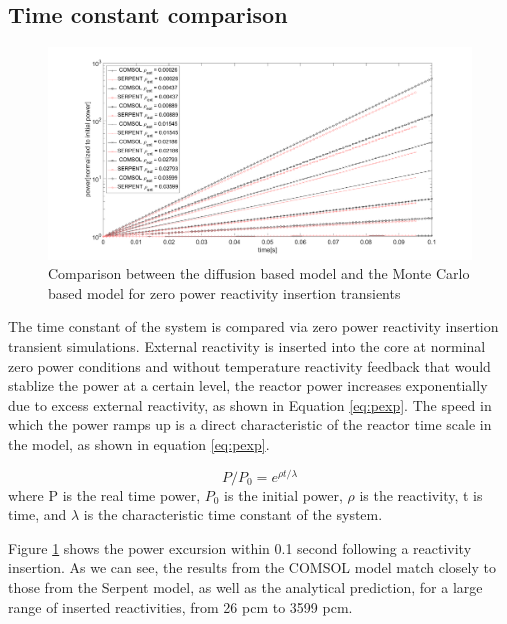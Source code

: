 \documentclass{elsarticle}
\begin{document}
\subsection{Time constant comparison}
\label{sec:time_scale}

\begin{figure}[h]
  \centering
  \includegraphics[width=\columnwidth]{./images/benchmark/zero_power_transient.png}
  \caption{Comparison between the diffusion based model and the Monte Carlo based model for zero power reactivity insertion transients}
  \label{fig:zero_power}
\end{figure}

The time constant of the system is compared via zero power reactivity insertion transient simulations. External reactivity is inserted into the core at norminal zero power conditions and without temperature reactivity feedback that would stablize the power at a certain level, the reactor power increases exponentially due to excess external reactivity, as shown in Equation \ref{eq:pexp}. 
The speed in which the power ramps up is a direct characteristic of the reactor time scale in the model, as shown in equation \ref{eq:pexp}. 

\begin{equation}
P/P_0 =  e^{\rho t/\lambda}
\label{eq:pexp}
\end{equation}
where P is the real time power, $P_0$ is the initial power, $\rho$ is the reactivity, t is time, and $\lambda$ is the characteristic time constant of the system. 

Figure \ref{fig:zero_power} shows the power excursion within 0.1 second following a reactivity insertion.
As we can see, the results from the COMSOL model match closely to those from the Serpent model, as well as the analytical prediction, for a large range of inserted reactivities, from 26 pcm to 3599 pcm.  
\end{document}
